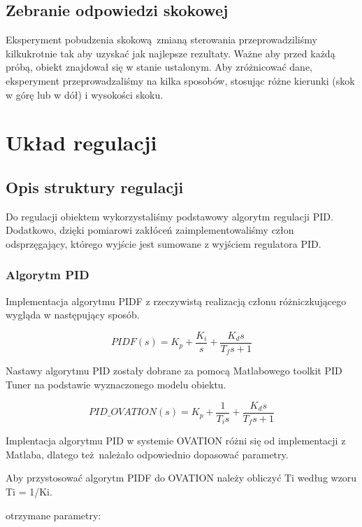\documentclass{mwrep}
\begin{document}
\section{Zebranie odpowiedzi skokowej}
\label{OdpowiedzSkokowa}
Eksperyment pobudzenia skokową zmianą sterowania przeprowadziliśmy kilkukrotnie tak aby uzyskać jak najlepsze rezultaty. Ważne aby przed 
każdą próbą, obiekt znajdował się w stanie ustalonym. Aby zróżnicować dane, eksperyment przeprowadzaliśmy na kilka sposobów, stosując różne 
kierunki (skok w górę lub w dół) i wysokości skoku.

\chapter{Układ regulacji}
\label{UkladRegulacji}


\section{Opis struktury regulacji}
\label{OpisStruktury}

Do regulacji obiektem wykorzystaliśmy podstawowy algorytm regulacji PID. Dodatkowo, dzięki pomiarowi zakłóceń zaimplementowaliśmy
człon odsprzęgający, którego wyjście jest sumowane z wyjściem regulatora PID.

\subsection{Algorytm PID}
\label{PID}

Implementacja algorytmu PIDF z rzeczywistą realizacją członu różniczkującego wygląda w następujący sposób.

$$PIDF(s) = K _ { p } + \frac { K _ { i } } { s } + \frac { K _ { d } s } { T _ { f } s + 1 }$$

Nastawy algorytmu PID zostały dobrane za pomocą Matlabowego toolkit PID Tuner na podstawie wyznaczonego modelu obiektu.




$$PID\_OVATION(s) = K _ { p } + \frac { 1 } {  T _ { i } s } + \frac { K _ { d } s } { T _ { f } s + 1 }$$

Implentacja algorytmu PID w systemie OVATION różni się od implementacji z Matlaba, dlatego też należało odpowiednio dopasować
parametry.

Aby przystosować algorytm PIDF do OVATION należy obliczyć Ti według wzoru Ti = 1/Ki.

otrzymane parametry:
\end{document}
